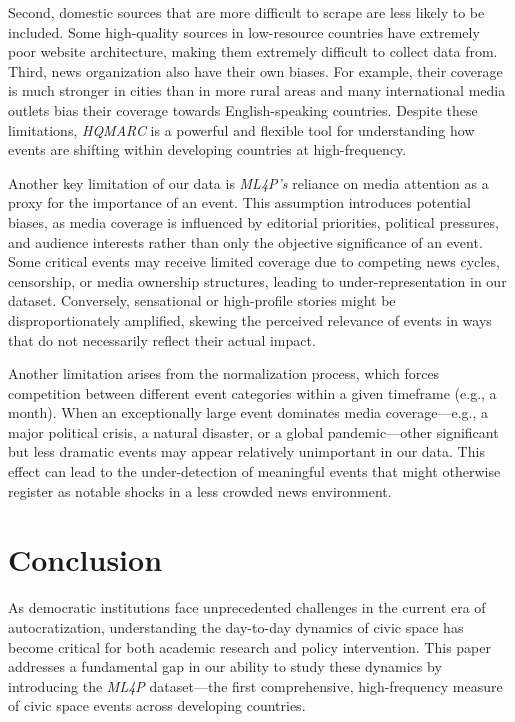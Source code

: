 \documentclass[
  letterpaper,
  DIV=11,
  numbers=noendperiod]{scrartcl}
\begin{document}
Second, domestic sources that are more difficult to scrape are less
likely to be included. Some high-quality sources in low-resource
countries have extremely poor website architecture, making them
extremely difficult to collect data from. Third, news organization also
have their own biases. For example, their coverage is much stronger in
cities than in more rural areas and many international media outlets
bias their coverage towards English-speaking countries. Despite these
limitations, \emph{HQMARC} is a powerful and flexible tool for
understanding how events are shifting within developing countries at
high-frequency.

Another key limitation of our data is \emph{ML4P's} reliance on media
attention as a proxy for the importance of an event. This assumption
introduces potential biases, as media coverage is influenced by
editorial priorities, political pressures, and audience interests rather
than only the objective significance of an event. Some critical events
may receive limited coverage due to competing news cycles, censorship,
or media ownership structures, leading to under-representation in our
dataset. Conversely, sensational or high-profile stories might be
disproportionately amplified, skewing the perceived relevance of events
in ways that do not necessarily reflect their actual impact.

Another limitation arises from the normalization process, which forces
competition between different event categories within a given timeframe
(e.g., a month). When an exceptionally large event dominates media
coverage---e.g., a major political crisis, a natural disaster, or a
global pandemic---other significant but less dramatic events may appear
relatively unimportant in our data. This effect can lead to the
under-detection of meaningful events that might otherwise register as
notable shocks in a less crowded news environment.

\hypertarget{sec-conclusion}{%
\section{Conclusion}\label{sec-conclusion}}

As democratic institutions face unprecedented challenges in the current
era of autocratization, understanding the day-to-day dynamics of civic
space has become critical for both academic research and policy
intervention. This paper addresses a fundamental gap in our ability to
study these dynamics by introducing the \emph{ML4P} dataset---the first
comprehensive, high-frequency measure of civic space events across
developing countries.
\end{document}
